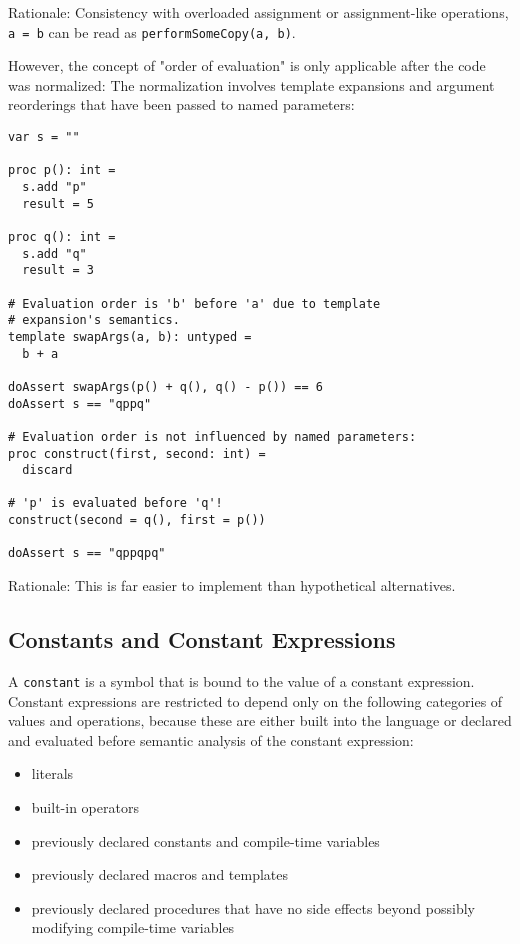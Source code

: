 Rationale: Consistency with overloaded assignment or assignment-like
operations, \texttt{a\ =\ b} can be read as
\texttt{performSomeCopy(a,\ b)}.

However, the concept of "order of evaluation" is only applicable after
the code was normalized: The normalization involves template expansions
and argument reorderings that have been passed to named parameters:

\begin{verbatim}
var s = ""

proc p(): int =
  s.add "p"
  result = 5

proc q(): int =
  s.add "q"
  result = 3

# Evaluation order is 'b' before 'a' due to template
# expansion's semantics.
template swapArgs(a, b): untyped =
  b + a

doAssert swapArgs(p() + q(), q() - p()) == 6
doAssert s == "qppq"

# Evaluation order is not influenced by named parameters:
proc construct(first, second: int) =
  discard

# 'p' is evaluated before 'q'!
construct(second = q(), first = p())

doAssert s == "qppqpq"
\end{verbatim}

Rationale: This is far easier to implement than hypothetical
alternatives.

\hypertarget{constants-and-constant-expressions}{%
\subsection{Constants and Constant
Expressions}\label{constants-and-constant-expressions}}

A \texttt{constant} is a symbol that is bound to the value of a constant
expression. Constant expressions are restricted to depend only on the
following categories of values and operations, because these are either
built into the language or declared and evaluated before semantic
analysis of the constant expression:

\begin{itemize}
\tightlist
\item
  literals
\item
  built-in operators
\item
  previously declared constants and compile-time variables
\item
  previously declared macros and templates
\item
  previously declared procedures that have no side effects beyond
  possibly modifying compile-time variables
\end{itemize}

